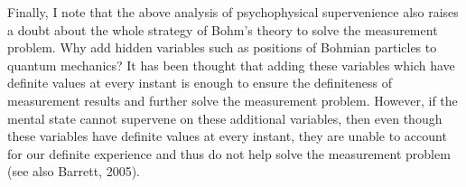 
Finally, I note that the above analysis of psychophysical supervenience also raises a doubt about the whole strategy of Bohm's theory to solve the measurement problem. Why add hidden variables such as positions of Bohmian particles to quantum mechanics? It has been thought that adding these variables which have definite values at every instant is enough to ensure the definiteness of measurement results and further solve the measurement problem.
However, if the mental state cannot supervene on these additional variables, then even though these variables have definite values at every instant, they are unable to account for our definite experience and thus do not help solve the measurement problem (see also Barrett, 2005).

